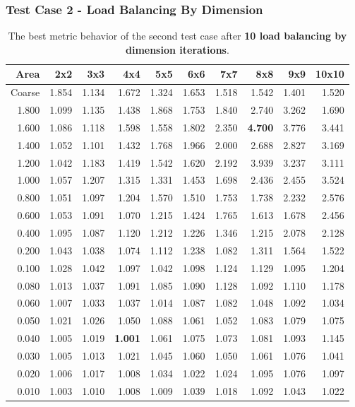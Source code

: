 \documentclass[compress]{beamer}
\begin{document}
\begin{frame}[t]\frametitle{Test Case 2 - Load Balancing By Dimension}
\begin{table}[H]
\tiny
\centering
\caption{The best metric behavior of the second test case after \textbf{10 load balancing by dimension iterations}.} 
\begin{tabular}{rrrrrrrrrr}
 \hline
 Area & 2x2 &3x3 & 4x4 & 5x5 & 6x6 & 7x7 &8x8 & 9x9 & 10x10 \\ 
\hline
 Coarse & 1.854 & 1.134 & 1.672 & 1.324 & 1.653 & 1.518 & 1.542 & 1.401 & 1.520 \\
  1.800 & 1.099 & 1.135 & 1.438 & 1.868 & 1.753 & 1.840 & 2.740 & 3.262 & 1.690 \\
  1.600 & 1.086 & 1.118 & 1.598 & 1.558 & 1.802 & 2.350 & \textbf{\cellcolor{blue!25}4.700} & 3.776 & 3.441 \\
  1.400 & 1.052 & 1.101 & 1.432 & 1.768 & 1.966 & 2.000 & 2.688 & 2.827 & 3.169 \\
  1.200 & 1.042 & 1.183 & 1.419 & 1.542 & 1.620 & 2.192 & 3.939 & 3.237 & 3.111 \\
  1.000 & 1.057 & 1.207 & 1.315 & 1.331 & 1.453 & 1.698 & 2.436 & 2.455 & 3.524 \\
  0.800 & 1.051 & 1.097 & 1.204 & 1.570 & 1.510 & 1.753 & 1.738 & 2.232 & 2.576 \\
  0.600 & 1.053 & 1.091 & 1.070 & 1.215 & 1.424 & 1.765 & 1.613 & 1.678 & 2.456 \\
  0.400 & 1.095 & 1.087 & 1.120 & 1.212 & 1.226 & 1.346 & 1.215 & 2.078 & 2.128 \\
  0.200 & 1.043 & 1.038 & 1.074 & 1.112 & 1.238 & 1.082 & 1.311 & 1.564 & 1.522 \\
  0.100 & 1.028 & 1.042 & 1.097 & 1.042 & 1.098 & 1.124 & 1.129 & 1.095 & 1.204 \\
  0.080 & 1.013 & 1.037 & 1.091 & 1.085 & 1.090 & 1.128 & 1.092 & 1.110 & 1.178 \\
  0.060 & 1.007 & 1.033 & 1.037 & 1.014 & 1.087 & 1.082 & 1.048 & 1.092 & 1.034 \\
  0.050 & 1.021 & 1.026 & 1.050 & 1.088 & 1.061 & 1.052 & 1.083 & 1.079 & 1.075 \\
  0.040 & 1.005 & 1.019 & \textbf{\cellcolor{blue!25}1.001} & 1.061 & 1.075 & 1.073 & 1.081 & 1.093 & 1.145 \\
  0.030 & 1.005 & 1.013 & 1.021 & 1.045 & 1.060 & 1.050 & 1.061 & 1.076 & 1.041 \\
  0.020 & 1.006 & 1.017 & 1.008 & 1.034 & 1.022 & 1.024 & 1.095 & 1.076 & 1.097 \\
  0.010 & 1.003 & 1.010 & 1.008 & 1.009 & 1.039 & 1.018 & 1.092 & 1.043 & 1.022 \\
\hline
\end{tabular}
\end{table}
\end{frame}
\end{document}

